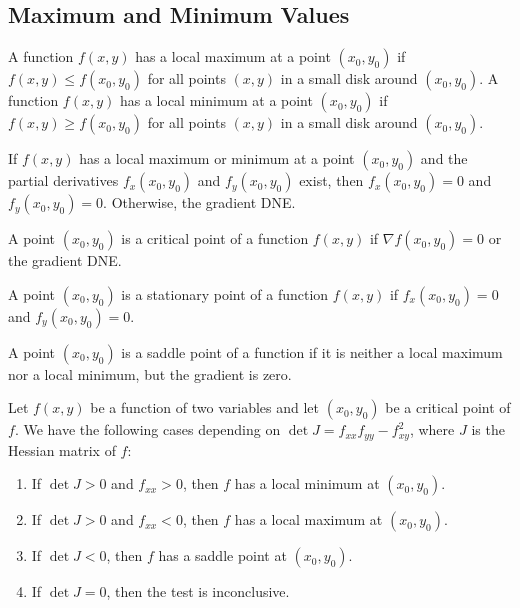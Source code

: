 \documentclass[11pt]{report}
\begin{document}
\subsection{Maximum and Minimum Values}
\begin{definition}
    A function $f(x, y)$ has a local maximum at a point $(x_0, y_0)$ if $f(x, y) \le f(x_0, y_0)$ for all points $(x, y)$ in a small disk around $(x_0, y_0)$. A function $f(x, y)$ has a local minimum at a point $(x_0, y_0)$ if $f(x, y) \ge f(x_0, y_0)$ for all points $(x, y)$ in a small disk around $(x_0, y_0)$.
\end{definition}
\begin{theorem}
    If $f(x, y)$ has a local maximum or minimum at a point $(x_0, y_0)$ and the partial derivatives $f_x(x_0, y_0)$ and $f_y(x_0, y_0)$ exist, then $f_x(x_0, y_0) = 0$ and $f_y(x_0, y_0) = 0$. Otherwise, the gradient DNE.
\end{theorem}
\begin{definition}
    A point $(x_0, y_0)$ is a critical point of a function $f(x, y)$ if $\nabla f(x_0, y_0) = 0$ or the gradient DNE.
\end{definition}
\begin{definition}
    A point $(x_0, y_0)$ is a stationary point of a function $f(x, y)$ if $f_x(x_0, y_0) = 0$ and $f_y(x_0, y_0) = 0$.
\end{definition}
\begin{definition}
    A point $(x_0, y_0)$ is a saddle point of a function if it is neither a local maximum nor a local minimum, but the gradient is zero.
\end{definition}
\begin{theorem}
    Let $f(x, y)$ be a function of two variables and let $(x_0, y_0)$ be a critical point of $f$. We have the following cases depending on $\det{J} = f_{xx}f_{yy} - f_{xy}^2$, where $J$ is the Hessian matrix of $f$:
    \begin{enumerate}
        \item If $\det{J} > 0$ and $f_{xx} > 0$, then $f$ has a local minimum at $(x_0, y_0)$.
        \item If $\det{J} > 0$ and $f_{xx} < 0$, then $f$ has a local maximum at $(x_0, y_0)$.
        \item If $\det{J} < 0$, then $f$ has a saddle point at $(x_0, y_0)$.
        \item If $\det{J} = 0$, then the test is inconclusive.
    \end{enumerate} 
\end{theorem}
\end{document}
